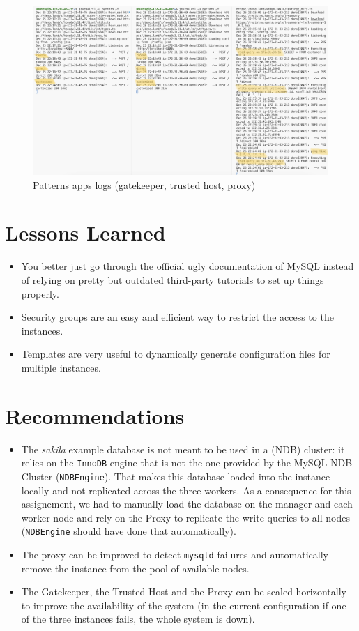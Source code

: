 \documentclass[letterpaper,headings=standardclasses,parskip=half]{scrartcl}
\begin{document}
\begin{figure}[h]
    \centering
    \includegraphics[width=\linewidth]{figures/Screenshot 2023-12-25 at 23.24.34.png}
    \caption{Patterns apps logs (gatekeeper, trusted host, proxy)}
    \label{fig:patterns_logs}
\end{figure}

\clearpage
\section{Lessons Learned}

\begin{itemize}
    \item You better just go through the official ugly documentation of MySQL instead of relying on pretty but outdated third-party tutorials to set up things properly.
    \item Security groups are an easy and efficient way to restrict the access to the instances.
    \item Templates are very useful to dynamically generate configuration files for multiple instances.
\end{itemize}

\section{Recommendations}

\begin{itemize}
    \item The \textit{sakila} example database is not meant to be used in a (NDB) cluster: it relies on the \texttt{InnoDB} engine that is not the one provided by the MySQL NDB Cluster (\texttt{NDBEngine}). That makes this database loaded into the instance locally and not replicated across the three workers. As a consequence for this assignement, we had to manually load the database on the manager and each worker node and rely on the Proxy to replicate the write queries to all nodes (\texttt{NDBEngine} should have done that automatically).
    \item The proxy can be improved to detect \texttt{mysqld} failures and automatically remove the instance from the pool of available nodes.
    \item The Gatekeeper, the Trusted Host and the Proxy can be scaled horizontally to improve the availability of the system (in the current configuration if one of the three instances fails, the whole system is down).
\end{itemize}
\end{document}

